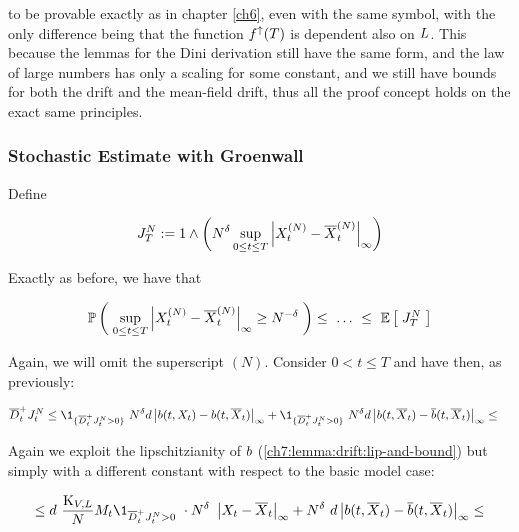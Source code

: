 to be provable exactly as in chapter \ref{ch6}, even with the same symbol, with the only difference being that  the function $f^\uparrow(T)$ is dependent also on $L$.
This because the lemmas for the Dini derivation still have the same form, and the law of large numbers has only a scaling for some constant, and we still have bounds for both the drift and the mean-field drift, thus all the proof concept holds on the exact same principles.

\subsubsection{Stochastic Estimate with Groenwall}

Define

\begin{equation}
	J_T^N := 1 \wedge \left( 
	N^{\delta}
	\sup_{0 \leq t \leq T}
	{ \left| 
		X_t^{(N)} - \overline{X}_t^{(N)}
	 \right|_{\infty} } \right)
\end{equation}

Exactly as before, we have that

\begin{align*}
	\mathbb{P} \left( \;   
		\sup_{0 \leq t \leq T}
		{ \left| 
			X_t^{(N)} - \overline{X}_t^{(N)}
		 \right|_{\infty} } 
		\geq
		N^{-\delta}
	 \; \right)
	\leq\
	\ldots\
	\leq\
	\mathbb{E} \left[ \;  
		J_T^N
	 \; \right] 
\end{align*}

Again, we will omit the superscript $(N)$.
Consider $0 < t \leq T$ and have then, as previously:

\begin{align*}
	\diniu^+_t \auxProc_t^N 
	&
	\leq
	\1_{\{\diniu^+_t \auxProc_t^N >0 \}}\
	N^{\cutparameter}d  \norm{\drift(t, \sol_t) - \drift(t, \mfsol_t)}_\infty 
	+  
	\1_{\{\diniu^+_t \auxProc_t^N >0 \}}\
	N^{\cutparameter}d  \norm{\drift(t, \mfsol_t) - \mfdrift(t, \mfsol_t)}_\infty \leq
\end{align*}

Again we exploit the lipschitzianity of $b$ (\ref{ch7:lemma:drift:lip-and-bound}) but simply with a different constant with respect to the basic model case:

\begin{align*}
	\leq
	d\
	\frac{\const_{\attraction,\NumCampRelease}}{N}
	\hmactive_t
		\1_{\diniu^+_t \auxProc_t^N >0 }\
		\cdot 
		N^{\cutparameter}\
		\norm{\sol_t - \mfsol_t}_\infty
	+ N^{\cutparameter}\
	d\norm{\drift(t, \mfsol_t) - \mfdrift(t, \mfsol_t)}_\infty \leq
\end{align*}

